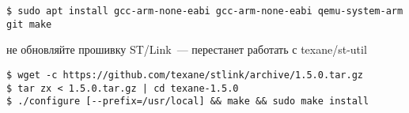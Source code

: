 \secdown


\begin{lstlisting}
$ sudo apt install gcc-arm-none-eabi gcc-arm-none-eabi qemu-system-arm git make
\end{lstlisting}


\begin{framed}
\noindent не обновляйте прошивку ST/Link\ --- перестанет работать с
texane/st-util
\end{framed}

\begin{lstlisting}
$ wget -c https://github.com/texane/stlink/archive/1.5.0.tar.gz
$ tar zx < 1.5.0.tar.gz | cd texane-1.5.0
$ ./configure [--prefix=/usr/local] && make && sudo make install
\end{lstlisting}

\secup
